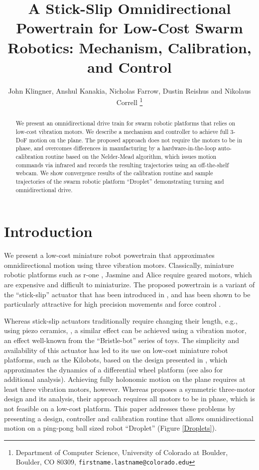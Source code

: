 \documentclass[letterpaper, 10pt, conference]{ieeeconf}
\title{\LARGE \bf
A Stick-Slip Omnidirectional Powertrain for Low-Cost Swarm Robotics: Mechanism, Calibration, and Control
}
\author{John Klingner, Anshul Kanakia, Nicholas Farrow, Dustin Reishus and Nikolaus Correll%
\thanks{Department of Computer Science,
University of Colorado at Boulder,
 Boulder, CO 80309,
{\tt\small firstname.lastname{@}colorado.edu}}%
}
\begin{document}
\maketitle


\begin{abstract}
We present an omnidirectional drive train for swarm robotic platforms that relies on low-cost vibration motors. We describe a mechanism and controller to achieve full 3-DoF motion on the plane. The proposed approach does not require the motors to be in phase, and overcomes differences in manufacturing by a hardware-in-the-loop auto-calibration routine based on the Nelder-Mead algorithm, which issues motion commands via infrared and records the resulting trajectories using an off-the-shelf webcam. We show convergence results of the calibration routine and sample trajectories of the swarm robotic platform ``Droplet'' demonstrating turning and omnidirectional drive.   
\end{abstract}



\section{Introduction}
We present a low-cost miniature robot powertrain that approximates omnidirectional motion using three vibration motors. Classically, miniature robotic platforms such as r-one \cite{mclurkin2013low}, Jasmine \cite{jasmine} and Alice \cite{alice} require geared motors, which are expensive and difficult to miniaturize. The proposed powertrain is a variant of the ``stick-slip'' actuator that has been introduced in \cite{breguet1998stick}, and has been shown to be particularly attractive for high precision movements \cite{brufau2005micron,chu2006novel,martel2001three,martel2005fundamental,eigoli2012locomotion} and force control \cite{vartholomeos2008analysis}.   

Whereas stick-slip actuators traditionally require changing their length, e.g., using piezo ceramics,  \cite{breguet1998stick, martel2005fundamental}, a similar effect can be achieved using a vibration motor, an effect well-known from the ``Bristle-bot'' series of toys. The simplicity and availability of this actuator  has led to its use on low-cost miniature robot platforms, such as the Kilobots, \cite{rubenstein2012kilobot} based on the design presented in \cite{Vartholomeos2006}, which approximates the dynamics of a differential wheel platform (see also \cite{spartali2013speed} for additional analysis). Achieving fully holonomic motion on the plane requires at least three vibration motors, however. Whereas \cite{Vartholomeos2005} proposes a symmetric three-motor design and its analysis, their approach requires all motors to be in phase, which is not feasible on a low-cost platform. This paper addresses these problems by presenting a design, controller and calibration routine that allows omnidirectional motion on a ping-pong ball sized robot ``Droplet'' (Figure \ref{Droplets}).
\end{document}
